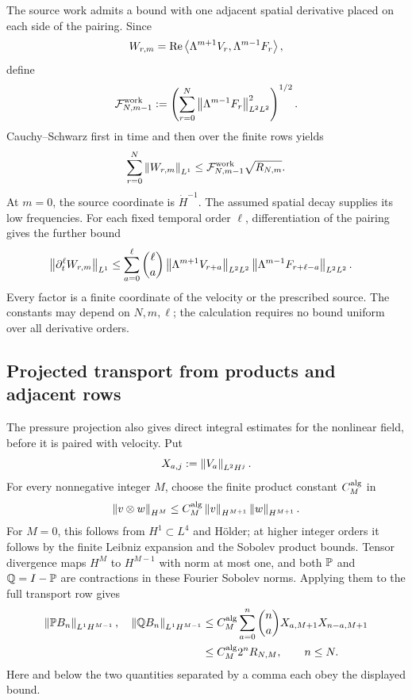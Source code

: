 The source work admits a bound with one adjacent spatial derivative
placed on each side of the pairing.  Since
\[
 W_{r,m}
 =\operatorname{Re}\left\langle \Lambda^{m+1}V_r,\Lambda^{m-1}F_r\right\rangle,
\]
define
\[
 \mathcal F_{N,m-1}^{\rm work}
 :=\left(\sum_{r=0}^N
 \left\lVert \Lambda^{m-1}F_r\right\rVert_{L^2L^2}^2\right)^{1/2}.
\]
Cauchy--Schwarz first in time and then over the finite rows yields
\begin{equation}
 \sum_{r=0}^N\left\lVert W_{r,m}\right\rVert_{L^1}
 \le\mathcal F_{N,m-1}^{\rm work}\sqrt{R_{N,m}}.
 \label{r:eq:all-row-force-work}
\end{equation}
At \(m=0\), the source coordinate is \(\dot H^{-1}\).  The assumed
spatial decay supplies its low frequencies.  For each fixed temporal
order \(\ell\), differentiation of the pairing gives the further bound
\begin{equation}
 \begin{aligned}
 \left\lVert \partial_t^\ell W_{r,m}\right\rVert_{L^1}
 &\le\sum_{a=0}^{\ell}\binom\ell a
 \left\lVert \Lambda^{m+1}V_{r+a}\right\rVert_{L^2L^2}
 \left\lVert \Lambda^{m-1}F_{r+\ell-a}\right\rVert_{L^2L^2}.
 \end{aligned}
 \label{r:eq:all-row-force-work-derivatives}
\end{equation}
Every factor is a finite coordinate of the velocity or the prescribed
source.  The constants may depend on \(N,m,\ell\); the calculation
requires no bound uniform over all derivative orders.

\subsection{Projected transport from products and adjacent rows}

The pressure projection also gives direct integral estimates for the
nonlinear field, before it is paired with velocity.  Put
\[
 X_{a,j}:=\left\lVert V_a\right\rVert_{L^2H^j}.
\]
For every nonnegative integer \(M\), choose the finite product constant
\(C_M^{\rm alg}\) in
\[
 \left\lVert v\otimes w\right\rVert_{H^M}
 \le C_M^{\rm alg}\left\lVert v\right\rVert_{H^{M+1}}\left\lVert w\right\rVert_{H^{M+1}}.
\]
For \(M=0\), this follows from \(H^1\subset L^4\) and H\"older;
at higher integer orders it follows by the finite Leibniz expansion
and the Sobolev product bounds.  Tensor divergence maps \(H^M\) to
\(H^{M-1}\) with norm at most one, and both \(\mathbb P\) and
\(\mathbb Q=I-\mathbb P\) are contractions in these Fourier Sobolev norms.
Applying them to the full transport row gives
\begin{equation}
 \begin{aligned}
 \left\lVert \mathbb P B_n\right\rVert_{L^1H^{M-1}},\quad
 \left\lVert \mathbb Q B_n\right\rVert_{L^1H^{M-1}}
 &\le C_M^{\rm alg}
 \sum_{a=0}^n\binom na X_{a,M+1}X_{n-a,M+1}\\
 &\le C_M^{\rm alg}2^nR_{N,M},\qquad n\le N.
 \end{aligned}
 \label{r:eq:projected-transport-product-integral}
\end{equation}
Here and below the two quantities separated by a comma each obey the
displayed bound.


